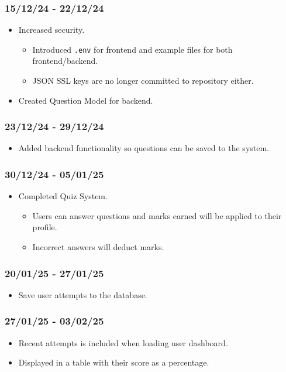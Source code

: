 \documentclass[]{final_report}
\begin{document}
\subsubsection*{15/12/24 - 22/12/24}
\begin{itemize}
    \item Increased security. 
    \begin{itemize}
        \item Introduced \texttt{.env} for frontend and example files for both frontend/backend. 
        \item JSON SSL keys are no longer committed to repository either. 
    \end{itemize}
    \item Created Question Model for backend.
\end{itemize}

\subsubsection*{23/12/24 - 29/12/24}
\begin{itemize}
    \item Added backend functionality so questions can be saved to the system.
\end{itemize}

\subsubsection*{30/12/24 - 05/01/25}
\begin{itemize}
    \item Completed Quiz System. 
    \begin{itemize}
        \item Users can answer questions and marks earned will be applied to their profile. 
        \item Incorrect answers will deduct marks.
    \end{itemize}
\end{itemize}

\subsubsection*{20/01/25 - 27/01/25}
\begin{itemize}
    \item Save user attempts to the database.
\end{itemize}

\subsubsection*{27/01/25 - 03/02/25}
\begin{itemize}
    \item Recent attempts is included when loading user dashboard. 
    \item Displayed in a table with their score as a percentage.
\end{itemize}
\end{document}
